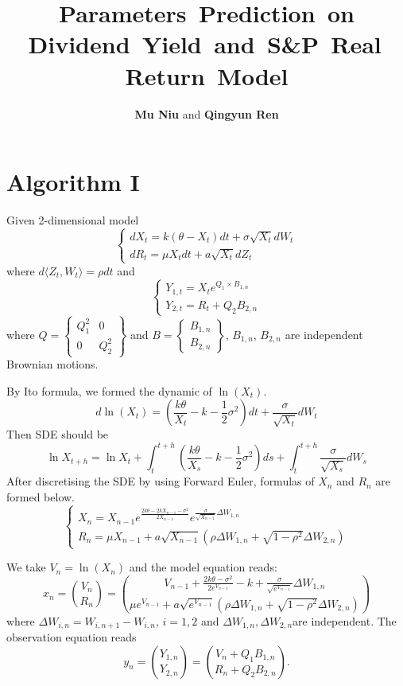 \documentclass{amsart}
\numberwithin{equation}{section}
\begin{document}
\title{Parameters \,Prediction\, on \\
 Dividend \,Yield\, and \,S\&P\, Real\, Return \,Model}
 
\author{
\textbf{Mu Niu}
 and 
\textbf{Qingyun Ren}}
\maketitle
 


\section{Algorithm I}
Given 2-dimensional model
$$
\begin{cases}
dX_{t}=k(\theta-X_t)dt+\sigma\sqrt{X_{t}}dW_{t}\\
dR_{t} = \mu X_{t}dt+a\sqrt{X_{t}}dZ_{t}
\end{cases}
$$
where $d\langle Z_{t},W_{t}\rangle=\rho dt$ and 
$$
\begin{cases}
Y_{1,t} = X_{t}e^{ Q_{1 }\times B_{1,n}}\\
Y_{2,t} = R_{t}+Q_{2}  B_{2,n}
\end{cases}
$$
where $Q = \left\{
\begin{matrix}
Q_{1}^2 &  0\\
0 & Q_{2}^2
\end{matrix}
\right\}
$ and $B = \left\{
\begin{matrix}
B_{1,n}\\
B_{2,n}
\end{matrix}
\right\}
$, $B_{1,n}$, $B_{2,n}$ are independent Brownian motions.

By Ito formula, we formed the dynamic of $\ln(X_{t})$.
$$
d\ln({X_{t}})=(\frac{k\theta}{X_{t}}-k-\frac{1}{2}\sigma^{2})dt+\frac{\sigma}{\sqrt{X_{t}}}dW_{t}
$$
Then SDE should be 
$$
\ln{X_{t+h}}=\ln{X_{t}}+\int_{t}^{t+h}(\frac{k\theta}{X_{s}}-k-\frac{1}{2}\sigma^{2})ds+\int_{t}^{t+h}\frac{\sigma}{\sqrt{X_{s}}}dW_{s}
$$
After discretising the SDE by using Forward Euler, formulas of $X_{n}$ and $R_{n}$ are formed below. 
%
$$
\begin{cases}
X_{n} = X_{n-1}e^{\frac{2k\theta-2kX_{n-1}-\sigma^{2}}{2X_{n-1}}}e^{\frac{\sigma}{\sqrt{X_{n-1}}}\Delta W_{1,n}}\\
R_{n} = \mu X_{n-1}+a\sqrt{X_{n-1}}(\rho\Delta W_{1,n}+\sqrt{1-\rho^2}\Delta W_{2,n})
\end{cases}
$$

We take $V_{n}=\ln(X_{n})$   and    the model equation reads:
%
$$
x_{n}= \binom{V_{n}}{R_{n} }= 
\binom{
 V_{n-1}+\frac{2k\theta-\sigma^{2}}{2e^{V_{n-1}}}-k+\frac{\sigma}{\sqrt{e^{V_{n-1}}}}\Delta W_{1,n}} {  \mu e^{V_{n-1}}+a\sqrt{e^{V_{n-1}}}(\rho\Delta W_{1,n}+\sqrt{1-\rho^2}\Delta W_{2,n})} 
$$
where $\Delta W_{i,n}=W_{i,n+1}-W_{i,n}$, $i=1,2$ and $\Delta W_{1,n},\Delta W_{2,n}$are independent. 
The observation equation reads 
$$
y_{n}= \binom{Y_{1,n} }{Y_{2,n} }=
\binom{  V_{n}+ {Q_{1}}B_{1,n}}{
  R_{n}+ {Q_{2}}B_{2,n}}.
$$
\end{document}
